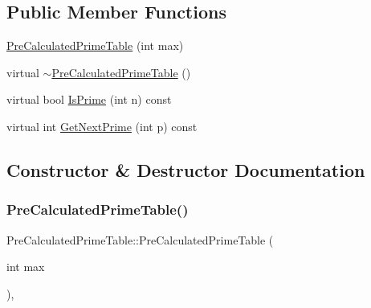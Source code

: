 \subsection*{Public Member Functions}
\begin{DoxyCompactItemize}
\item 
\hyperlink{class_pre_calculated_prime_table_a6bb947504421e31da70d2c71576be350}{Pre\+Calculated\+Prime\+Table} (int max)
\item 
virtual \hyperlink{class_pre_calculated_prime_table_a6ceab295f80dbe2766b8d4f54138bbc4}{$\sim$\+Pre\+Calculated\+Prime\+Table} ()
\item 
virtual bool \hyperlink{class_pre_calculated_prime_table_a8a9ab7f99b09e5e987933c260e7304cf}{Is\+Prime} (int n) const
\item 
virtual int \hyperlink{class_pre_calculated_prime_table_a0ff10b1fe13df7e56b8d7ed9f41d3998}{Get\+Next\+Prime} (int p) const
\end{DoxyCompactItemize}


\subsection{Constructor \& Destructor Documentation}
\mbox{\label{class_pre_calculated_prime_table_a6bb947504421e31da70d2c71576be350}} 
\subsubsection{\texorpdfstring{Pre\+Calculated\+Prime\+Table()}{PreCalculatedPrimeTable()}}
{\footnotesize\ttfamily Pre\+Calculated\+Prime\+Table\+::\+Pre\+Calculated\+Prime\+Table (\begin{DoxyParamCaption}\item[{int}]{max }\end{DoxyParamCaption})\hspace{0.3cm}{\ttfamily [inline]}, {\ttfamily [explicit]}}

\mbox{\label{class_pre_calculated_prime_table_a6ceab295f80dbe2766b8d4f54138bbc4}} 
